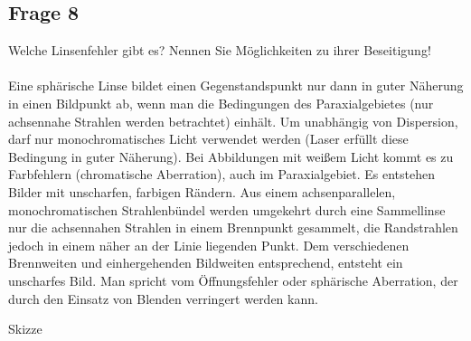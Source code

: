 \documentclass[a4paper,10pt]{scrartcl}
\begin{document}
			\subsection{Frage 8}
		Welche Linsenfehler gibt es? Nennen Sie Möglichkeiten zu ihrer Beseitigung!
		\\
		\\
		Eine sphärische Linse bildet einen Gegenstandspunkt nur dann in guter Näherung in einen Bildpunkt ab, wenn man die Bedingungen des Paraxialgebietes (nur achsennahe Strahlen werden betrachtet) einhält. Um unabhängig von Dispersion, darf nur monochromatisches Licht verwendet werden (Laser erfüllt diese Bedingung in guter Näherung). Bei Abbildungen mit weißem Licht kommt es zu Farbfehlern (chromatische Aberration), auch im Paraxialgebiet. Es entstehen Bilder mit unscharfen, farbigen Rändern. Aus einem achsenparallelen, monochromatischen Strahlenbündel werden umgekehrt durch eine Sammellinse nur die achsennahen Strahlen in einem Brennpunkt gesammelt, die Randstrahlen jedoch in einem näher an der Linie liegenden Punkt. Dem verschiedenen Brennweiten und einhergehenden Bildweiten entsprechend, entsteht ein unscharfes Bild. Man spricht vom Öffnungsfehler oder sphärische Aberration, der durch den Einsatz von Blenden verringert werden kann.
	
			\begin{center}
			Skizze
			\end{center}
	
\end{document}
